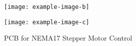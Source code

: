 \begin{figure}[H]
    \hfill
    \begin{minipage}[t]{0.45\textwidth}
      \centering
      \texttt{[image: example-image-b]}
    \end{minipage}
    \hfill
    \begin{minipage}[t]{0.45\textwidth}
      \centering
      \texttt{[image: example-image-c]}
    \end{minipage}
    \caption{PCB for NEMA17 Stepper Motor Control}
\end{figure}
